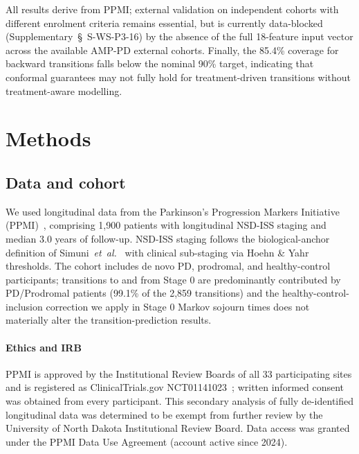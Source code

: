 \documentclass[11pt]{article}
\begin{document}
All results derive from PPMI; external validation on independent cohorts with different enrolment criteria remains essential, but is currently data-blocked (Supplementary~\S~S-WS-P3-16) by the absence of the full 18-feature input vector across the available AMP-PD external cohorts. Finally, the 85.4\% coverage for backward transitions falls below the nominal 90\% target, indicating that conformal guarantees may not fully hold for treatment-driven transitions without treatment-aware modelling.

\section{Methods}
\label{sec:methods}

\subsection*{Data and cohort}

We used longitudinal data from the Parkinson's Progression Markers Initiative (PPMI)~\cite{marek2018ppmi}, comprising 1{,}900 patients with longitudinal NSD-ISS staging and median 3.0 years of follow-up. NSD-ISS staging follows the biological-anchor definition of Simuni~\textit{et~al.}~\cite{simuni2024nsdiss} with clinical sub-staging via Hoehn \& Yahr thresholds. The cohort includes de novo PD, prodromal, and healthy-control participants; transitions to and from Stage 0 are predominantly contributed by PD/Prodromal patients (99.1\% of the 2{,}859 transitions) and the healthy-control-inclusion correction we apply in Stage 0 Markov sojourn times does not materially alter the transition-prediction results.

\paragraph*{Ethics and IRB} PPMI is approved by the Institutional Review Boards of all 33 participating sites and is registered as ClinicalTrials.gov NCT01141023~\cite{marek2018ppmi}; written informed consent was obtained from every participant. This secondary analysis of fully de-identified longitudinal data was determined to be exempt from further review by the University of North Dakota Institutional Review Board. Data access was granted under the PPMI Data Use Agreement (account active since 2024).
\end{document}
